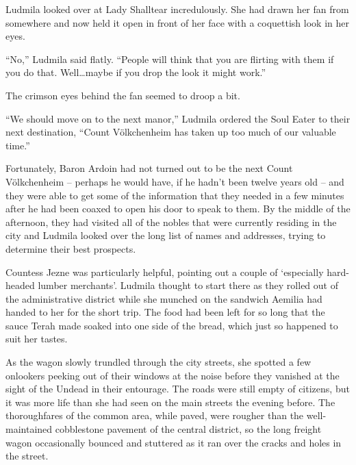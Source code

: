  

Ludmila looked over at Lady Shalltear incredulously. She had drawn her fan from somewhere and now held it open in front of her face with a coquettish look in her eyes.

 

“No,” Ludmila said flatly. “People will think that you are flirting with them if you do that. Well…maybe if you drop the look it might work.”

 

The crimson eyes behind the fan seemed to droop a bit.

 

“We should move on to the next manor,” Ludmila ordered the Soul Eater to their next destination, “Count Völkchenheim has taken up too much of our valuable time.”

 

Fortunately, Baron Ardoin had not turned out to be the next Count Völkchenheim – perhaps he would have, if he hadn’t been twelve years old – and they were able to get some of the information that they needed in a few minutes after he had been coaxed to open his door to speak to them. By the middle of the afternoon, they had visited all of the nobles that were currently residing in the city and Ludmila looked over the long list of names and addresses, trying to determine their best prospects.

 

Countess Jezne was particularly helpful, pointing out a couple of ‘especially hard-headed lumber merchants’. Ludmila thought to start there as they rolled out of the administrative district while she munched on the sandwich Aemilia had handed to her for the short trip. The food had been left for so long that the sauce Terah made soaked into one side of the bread, which just so happened to suit her tastes.

 

As the wagon slowly trundled through the city streets, she spotted a few onlookers peeking out of their windows at the noise before they vanished at the sight of the Undead in their entourage. The roads were still empty of citizens, but it was more life than she had seen on the main streets the evening before. The thoroughfares of the common area, while paved, were rougher than the well-maintained cobblestone pavement of the central district, so the long freight wagon occasionally bounced and stuttered as it ran over the cracks and holes in the street.

 

